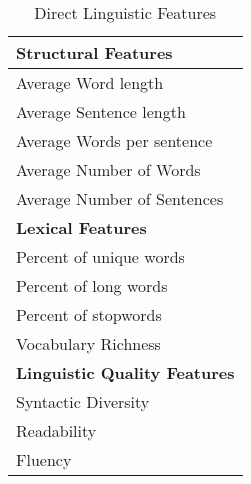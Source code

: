 \begin{table}[ht]
\centering
\footnotesize 
\begin{tabular}{@{}l@{}}
\toprule
\textbf{Structural Features} \\ \midrule
Average Word length \\
Average Sentence length \\
Average Words per sentence \\
Average Number of Words \\
Average Number of Sentences \\

\toprule
\textbf{Lexical Features} \\ \midrule
Percent of unique words \\
Percent of long words \\
Percent of stopwords \\
Vocabulary Richness \\

\toprule
\textbf{Linguistic Quality Features} \\ \midrule
Syntactic Diversity \\
Readability \\
Fluency \\

\bottomrule
\end{tabular}
\caption{Direct Linguistic Features}
\label{tab:Direct_Linguistic_Features}
\end{table}
